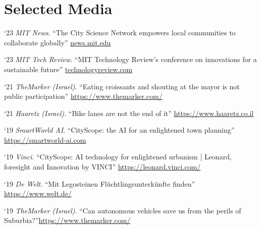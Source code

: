 \section*{Selected Media}
\begin{tablist}

    \item[`23] \tab \textit{MIT News}. \enquote{The City Science Network empowers local communities to collaborate globally}
    \href{https://news.mit.edu/2023/city-science-network-empowers-local-communities-collaborate-globally-1103}{news.mit.edu}
    
    \item[`23] \tab \textit{MIT Tech Review}. \enquote{MIT Technology Review’s conference
on innovations for a sustainable future}
    \href{https://event.technologyreview.com/climatetech-2023}{technologyreview.com}
    
    \item[`21] \tab \textit{TheMarker (Israel)}. \enquote{Eating croissants and shouting at the mayor is not public participation}
    \href{https://www.themarker.com/realestate/.premium-1.9490242}{https://www.themarker.com/}

    \item[`21] \tab \textit{Haaretz (Israel)}. \enquote{Bike lanes are not the end of it}
    \href{https://www.haaretz.co.il/magazine/.premium.HIGHLIGHT-MAGAZINE-1.10002361}{https://www.haaretz.co.il}

    \item[`19] \tab \textit{SmartWorld AI}. \enquote{CityScope: the AI for an enlightened town planning}
    \href{https://smartworld-ai.com/cityscope-the-ai-for-an-enlightened-town-planning/}{https://smartworld-ai.com}

    \item[`19] \tab \textit{Vinci}. \enquote{CityScope: AI technology for enlightened urbanism | Leonard, foresight and Innovation by VINCI}
    \href{https://leonard.vinci.com/en/cityscope-ai-technology-for-enlightened-urbanism/}{https://leonard.vinci.com/}

    \item[`19] \tab \textit{De Welt}. \enquote{Mit Legosteinen Flüchtlingsunterkünfte finden}
    \href{https://www.welt.de/regionales/hamburg/article152836431/Mit-Legosteinen-Fluechtlingsunterkuenfte-finden.html}{https://www.welt.de/}

    \item[`19] \tab \textit{TheMarker (Israel)}. \enquote{Can autonomous vehicles save us from the perils of Suburbia?}\href{https://www.themarker.com/magazine/.premium-MAGAZINE-1.6985623}{https://www.themarker.com/}


\end{tablist}
